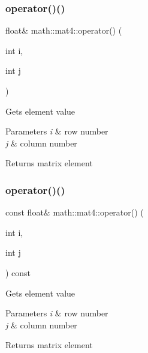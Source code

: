\subsubsection{\texorpdfstring{operator()()}{operator()()}\hspace{0.1cm}{\footnotesize\ttfamily [1/2]}}
{\footnotesize\ttfamily float\& math\+::mat4\+::operator() (\begin{DoxyParamCaption}\item[{int}]{i,  }\item[{int}]{j }\end{DoxyParamCaption})\hspace{0.3cm}{\ttfamily [inline]}}

Gets element value 
\begin{DoxyParams}{Parameters}
{\em i} & row number \\
\hline
{\em j} & column number \\
\hline
\end{DoxyParams}
\begin{DoxyReturn}{Returns}
matrix element 
\end{DoxyReturn}
\mbox{\label{structmath_1_1mat4_a920c9499848225190aba4add2cba66bf}} 
\subsubsection{\texorpdfstring{operator()()}{operator()()}\hspace{0.1cm}{\footnotesize\ttfamily [2/2]}}
{\footnotesize\ttfamily const float\& math\+::mat4\+::operator() (\begin{DoxyParamCaption}\item[{int}]{i,  }\item[{int}]{j }\end{DoxyParamCaption}) const\hspace{0.3cm}{\ttfamily [inline]}}

Gets element value 
\begin{DoxyParams}{Parameters}
{\em i} & row number \\
\hline
{\em j} & column number \\
\hline
\end{DoxyParams}
\begin{DoxyReturn}{Returns}
matrix element 
\end{DoxyReturn}
\mbox{\label{structmath_1_1mat4_a26e1decc5a95dfa924dfc2fdce10a8ec}} 
